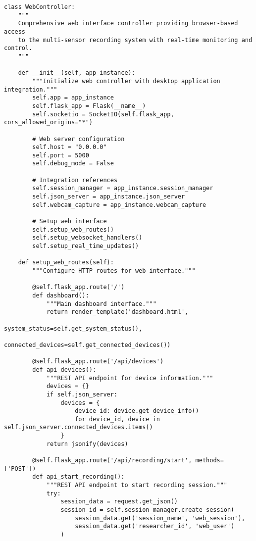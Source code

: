 \documentclass[12pt,a4paper]{article}
\begin{document}
\begin{verbatim}
class WebController:
    """
    Comprehensive web interface controller providing browser-based access
    to the multi-sensor recording system with real-time monitoring and control.
    """

    def __init__(self, app_instance):
        """Initialize web controller with desktop application integration."""
        self.app = app_instance
        self.flask_app = Flask(__name__)
        self.socketio = SocketIO(self.flask_app, cors_allowed_origins="*")

        # Web server configuration
        self.host = "0.0.0.0"
        self.port = 5000
        self.debug_mode = False

        # Integration references
        self.session_manager = app_instance.session_manager
        self.json_server = app_instance.json_server
        self.webcam_capture = app_instance.webcam_capture

        # Setup web interface
        self.setup_web_routes()
        self.setup_websocket_handlers()
        self.setup_real_time_updates()

    def setup_web_routes(self):
        """Configure HTTP routes for web interface."""

        @self.flask_app.route('/')
        def dashboard():
            """Main dashboard interface."""
            return render_template('dashboard.html',
                                   system_status=self.get_system_status(),
                                   connected_devices=self.get_connected_devices())

        @self.flask_app.route('/api/devices')
        def api_devices():
            """REST API endpoint for device information."""
            devices = {}
            if self.json_server:
                devices = {
                    device_id: device.get_device_info()
                    for device_id, device in self.json_server.connected_devices.items()
                }
            return jsonify(devices)

        @self.flask_app.route('/api/recording/start', methods=['POST'])
        def api_start_recording():
            """REST API endpoint to start recording session."""
            try:
                session_data = request.get_json()
                session_id = self.session_manager.create_session(
                    session_data.get('session_name', 'web_session'),
                    session_data.get('researcher_id', 'web_user')
                )


\end{verbatim}
\end{document}
